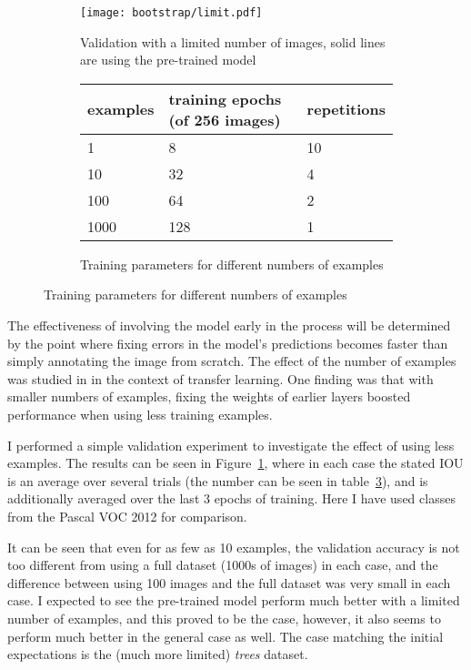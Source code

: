 \begin{figure}[ht!]
\begin{subfigure}[t]{1.0\textwidth}
  
\centering
\texttt{[image: bootstrap/limit.pdf]}
\caption {Validation with a limited number of images, solid lines are using the pre-trained model}
\label{fig:bootstrap_limited}
\end{subfigure}


\begin{subfigure}[t]{1.0\textwidth}
  \centering
 
  \begin{tabular}{ l  l  l}
    examples & training epochs (of 256 images) & repetitions \\
    \toprule
    1 	  & 8 	& 10 \\
    10 	  & 32 	& 4  \\
    100   & 64 	& 2 \\
    1000  & 128 & 1 \\
    \bottomrule
  \end{tabular}
  
  \caption{Training parameters for different numbers of examples}

\label{fig:bootstrap_limit_params}
\end{subfigure}

\end{figure}





The effectiveness of involving the model early in the process will be determined by the point where fixing errors in the model's predictions becomes faster than simply annotating the image from scratch. The effect of the number of examples was studied in \cite{Soekhoe} in the context of transfer learning. One finding was that with smaller numbers of examples, fixing the weights of earlier layers boosted performance when using less training examples.

I performed a simple validation experiment to investigate the effect of using less examples. The results can be seen in Figure~\ref{fig:bootstrap_limited}, where in each case the stated IOU is an average over several trials (the number can be seen in table~\ref{fig:bootstrap_limit_params}), and is additionally averaged over the last 3 epochs of training. Here I have used classes from the Pascal VOC 2012 for comparison.

It can be seen that even for as few as 10 examples, the validation accuracy is not too different from using a full dataset (1000s of images) in each case, and the difference between using 100 images and the full dataset was very small in each case. I expected to see the pre-trained model perform much better with a limited number of examples, and this proved to be the case, however, it also seems to perform much better in the general case as well. The case matching the initial expectations is the (much more limited) \emph{trees} dataset.



